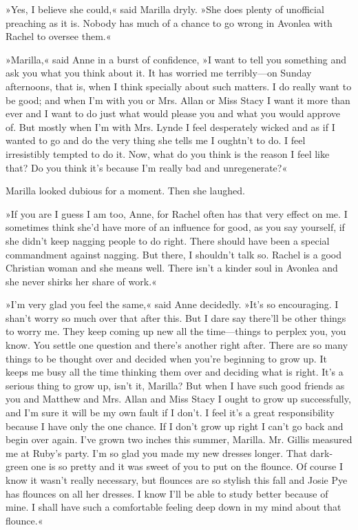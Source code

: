 »Yes, I believe she could,« said Marilla dryly. »She does plenty of unofficial preaching as it is. Nobody has much of a chance to go wrong in Avonlea with Rachel to oversee them.«

»Marilla,« said Anne in a burst of confidence, »I want to tell you something and ask you what you think about it. It has worried me terribly—on Sunday afternoons, that is, when I think specially about such matters. I do really want to be good; and when I'm with you or Mrs. Allan or Miss Stacy I want it more than ever and I want to do just what would please you and what you would approve of. But mostly when I'm with Mrs. Lynde I feel desperately wicked and as if I wanted to go and do the very thing she tells me I oughtn't to do. I feel irresistibly tempted to do it. Now, what do you think is the reason I feel like that? Do you think it's because I'm really bad and unregenerate?«

Marilla looked dubious for a moment. Then she laughed.

»If you are I guess I am too, Anne, for Rachel often has that very effect on me. I sometimes think she'd have more of an influence for good, as you say yourself, if she didn't keep nagging people to do right. There should have been a special commandment against nagging. But there, I shouldn't talk so. Rachel is a good Christian woman and she means well. There isn't a kinder soul in Avonlea and she never shirks her share of work.«

»I'm very glad you feel the same,« said Anne decidedly. »It's so encouraging. I shan't worry so much over that after this. But I dare say there'll be other things to worry me. They keep coming up new all the time—things to perplex you, you know. You settle one question and there's another right after. There are so many things to be thought over and decided when you're beginning to grow up. It keeps me busy all the time thinking them over and deciding what is right. It's a serious thing to grow up, isn't it, Marilla? But when I have such good friends as you and Matthew and Mrs. Allan and Miss Stacy I ought to grow up successfully, and I'm sure it will be my own fault if I don't. I feel it's a great responsibility because I have only the one chance. If I don't grow up right I can't go back and begin over again. I've grown two inches this summer, Marilla. Mr. Gillis measured me at Ruby's party. I'm so glad you made my new dresses longer. That dark-green one is so pretty and it was sweet of you to put on the flounce. Of course I know it wasn't really necessary, but flounces are so stylish this fall and Josie Pye has flounces on all her dresses. I know I'll be able to study better because of mine. I shall have such a comfortable feeling deep down in my mind about that flounce.«

